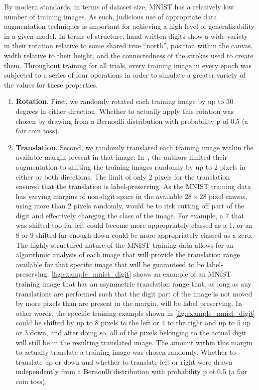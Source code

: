 \documentclass{article}
\newcommand{\rightparenthesis}{)}
\begin{document}
By modern standards, in terms of dataset size, MNIST has a relatively low number of training images.  As such, judicious use of appropriate data augmentation techniques is important for achieving a high level of generalizability in a given model.  In terms of structure, hand-written digits show a wide variety in their rotation relative to some shared true ``north'', position within the canvas, width relative to their height, and the connectedness of the strokes used to create them.  Throughout training for all trials, every training image in every epoch was subjected to a series of four operations in order to simulate a greater variety of the values for these properties.

\begin{enumerate}[label=\arabic*\rightparenthesis] \item \textbf{Rotation}.  First, we randomly rotated each training image by up to 30 degrees in either direction.  Whether to actually apply this rotation was chosen by drawing from a Bernoulli distribution with probability p of 0.5 (a fair coin toss).
\item \textbf{Translation}.  Second, we randomly translated each training image within the available margin present in that image.  In~\cite{Sabour2017}, the authors limited their augmentation to shifting the training images randomly by up to 2 pixels in either or both directions.  The limit of only 2 pixels for the translation ensured that the translation is label-preserving.  As the MNIST training data has varying margins of non-digit space in the available \(28\times28\) pixel canvas, using more than 2 pixels randomly, would be to risk cutting off part of the digit and effectively changing the class of the image.  For example, a 7 that was shifted too far left could become more appropriately classed as a 1, or an 8 or 9 shifted far enough down could be more appropriately classed as a zero.  The highly structured nature of the MNIST training data allows for an algorithmic analysis of each image that will provide the translation range available for that specific image that will be guaranteed to be label-preserving.  \autoref{fig:example_mnist_digit} shows an example of an MNIST training image that has an asymmetric translation range that, as long as any translations are performed such that the digit part of the image is not moved by more pixels than are present in the margin, will be label preserving.  In other words, the specific training example shown in \autoref{fig:example_mnist_digit} could be shifted by up to 8 pixels to the left or 4 to the right and up to 5 up or 3 down, and after doing so, all of the pixels belonging to the actual digit will still be in the resulting translated image.  The amount within this margin to actually translate a training image was chosen randomly.  Whether to translate up or down and whether to translate left or right were drawn independently from a Bernoulli distribution with probability p of 0.5 (a fair coin toss).


\end{enumerate}
\end{document}
